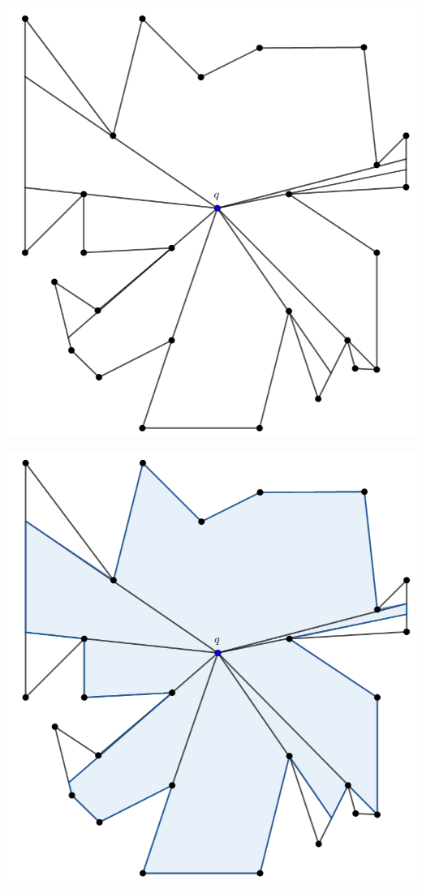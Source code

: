 {\begin{frame}
  \centering \includegraphics[width=0.55 \paperwidth]{images/V(q)09.png}
\end{frame}

\begin{frame}
  \centering \includegraphics[width=0.55 \paperwidth]{images/V(q)10.png}
\end{frame}

}
